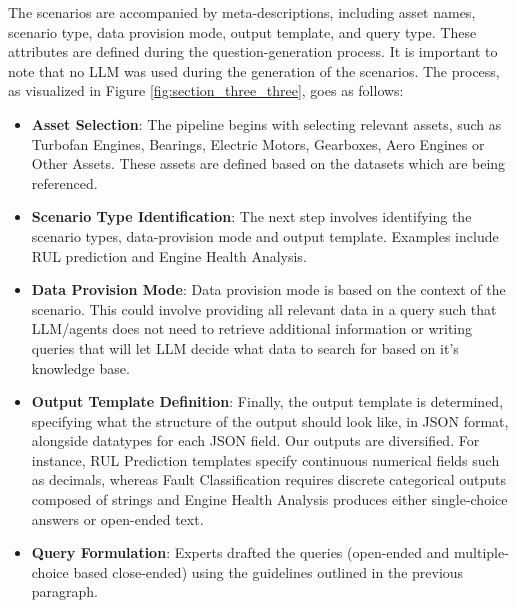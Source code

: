 \documentclass[sigconf,review]{acmart}
\begin{document}
The scenarios are accompanied by meta-descriptions, including asset names, scenario type, data provision mode, output template, and query type. These attributes are defined during the question-generation process. It is important to note that no LLM was used during the generation of the scenarios. The process, as visualized in Figure \ref{fig:section_three_three}, goes as follows:
\begin{itemize}
    \item \textbf{Asset Selection}: The pipeline begins with selecting relevant assets, such as Turbofan Engines, Bearings, Electric Motors, Gearboxes, Aero Engines or Other Assets. These assets are defined based on the datasets which are being referenced.
    \item \textbf{Scenario Type Identification}: The next step involves identifying the scenario types, data-provision mode and output template. Examples include RUL prediction and Engine Health Analysis.
    \item \textbf{Data Provision Mode}: Data provision mode is based on the context of the scenario. This could involve providing all relevant data in a query such that LLM/agents does not need to retrieve additional information or writing queries that will let LLM decide what data to search for based on it's knowledge base.
    \item \textbf{Output Template Definition}: Finally, the output template is determined, specifying what the structure of the output should look like, in JSON format, alongside datatypes for each JSON field. Our outputs are diversified. For instance, RUL Prediction templates specify continuous numerical fields such as decimals, whereas Fault Classification requires discrete categorical outputs composed of strings and Engine Health Analysis produces either single-choice answers or open-ended text.
    \item \textbf{Query Formulation}: Experts drafted the queries (open-ended and multiple-choice based close-ended) using the guidelines outlined in the previous paragraph.
\end{itemize}


\end{document}
